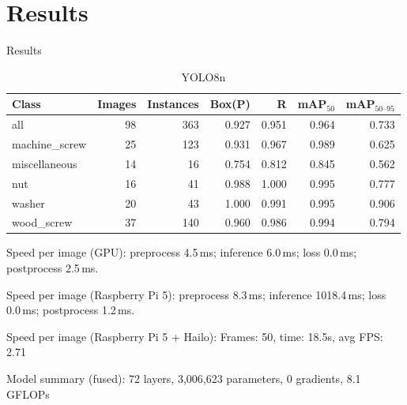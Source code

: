 \documentclass[aspectratio=169]{beamer}
\begin{document}
    \section{Results}
    \begin{frame}{Results}
        \begin{table}[!t]
        \centering
            \begin{subtable}{\linewidth}
              \centering
              \caption{YOLO8n}
              \begin{tabular}{lrrrrrr}
              \hline
              Class & Images & Instances & Box(P) & R & mAP$_{50}$ & mAP$_{50\mbox{--}95}$ \\
              \hline
              all            & 98 & 363 & 0.927 & 0.951 & 0.964 & 0.733 \\
              machine\_screw & 25 & 123 & 0.931 & 0.967 & 0.989 & 0.625 \\
              miscellaneous  & 14 &  16 & 0.754 & 0.812 & 0.845 & 0.562 \\
              nut            & 16 &  41 & 0.988 & 1.000 & 0.995 & 0.777 \\
              washer         & 20 &  43 & 1.000 & 0.991 & 0.995 & 0.906 \\
              wood\_screw    & 37 & 140 & 0.960 & 0.986 & 0.994 & 0.794 \\
              \hline
              \end{tabular}
              \par\smallskip
              \small Speed per image (GPU): preprocess 4.5\,ms; inference 6.0\,ms; loss 0.0\,ms; postprocess 2.5\,ms.
              \par\smallskip
              \small Speed per image (Raspberry Pi 5): preprocess 8.3\,ms; inference 1018.4\,ms; loss 0.0\,ms; postprocess 1.2\,ms.
              \par\smallskip
              \small Speed per image (Raspberry Pi 5 + Hailo): Frames: 50, time: 18.5s, avg FPS: 2.71
              \par\smallskip
              \small Model summary (fused): 72 layers, 3,006,623 parameters, 0 gradients, 8.1 GFLOPs
            \end{subtable}
        \end{table}
     \end{frame}
\end{document}
